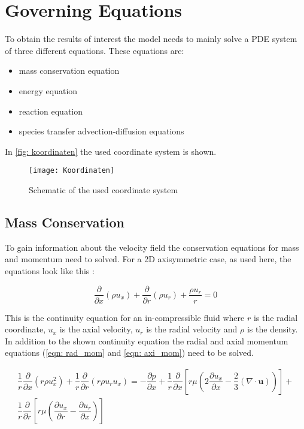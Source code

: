 \documentclass[../thesis.tex]{subfiles}
\begin{document}
\section{Governing Equations}
\label{sec:gov_eqn}
To obtain the results of interest the model needs to mainly solve a PDE system of three different equations. These equations are:
\begin{itemize}
	\item mass conservation equation
	\item energy equation
	\item reaction equation
	\item species transfer advection-diffusion equations
\end{itemize}
In \autoref{fig: koordinaten} the used coordinate system is shown.
\begin{figure}[htb]
	\centering
	\texttt{[image: Koordinaten]}
	\caption{Schematic of the used coordinate system}
	\label{fig: koordinaten}
\end{figure}

\subsection{Mass Conservation}
To gain information about the velocity field the conservation equations for mass and momentum need to solved. For a 2D axisymmetric case, as used here, the equations look like this \cite{manual2009ansys}:

\begin{equation}
\label{eqn:ansys_conti}
\dfrac{\partial}{\partial x} (\rho u_x) + \dfrac{\partial }{\partial r} (\rho u_r)
+ \dfrac{\rho u_r}{r} = 0
\end{equation}

This is the continuity equation for an in-compressible fluid where $r$ is the radial coordinate, $u_x$ is the axial velocity, $u_r$ is the radial velocity and $\rho$ is the density. In addition to the shown continuity equation the radial and axial momentum equations (\autoref{eqn: rad_mom} and \autoref{eqn: axi_mom}) need to be solved.

\begin{gather}
	\label{eqn: rad_mom}
	\dfrac{1}{r} \dfrac{\partial}{\partial x}(r \rho u_x^2)
	+ \dfrac{1}{r} \dfrac{\partial}{\partial r}(r \rho u_r u_x) = 
	- \dfrac{\partial p}{\partial x} + \dfrac{1}{r} \dfrac{\partial }{\partial x} \left[ 
	r \mu \left( 2 \dfrac{\partial u_x}{\partial x} - \dfrac{2}{3}(\nabla \cdot \mathbf{u}) \right)
	\right] + \\ \nonumber
	\dfrac{1}{r} \dfrac{\partial }{\partial r} \left[ 
	r \mu \left( \dfrac{\partial u_x}{\partial r} - \dfrac{\partial u_r}{\partial x} \right)
	\right]	
\end{gather}
\end{document}

